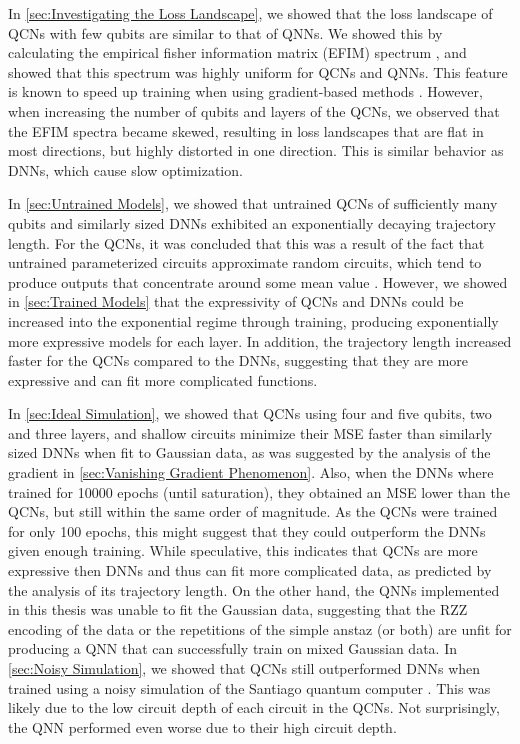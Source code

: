 In \cref{sec:Investigating the Loss Landscape}, we showed that the loss landscape of QCNs with few qubits are similar to that of QNNs. We showed this by calculating the empirical fisher information matrix (EFIM) spectrum \cite{karakida2019universal}, and showed that this spectrum was highly uniform for QCNs and QNNs. This feature is known to speed up training when using gradient-based methods \cite{karakida2019universal}. However, when increasing the number of qubits and layers of the QCNs, we observed that the EFIM spectra became skewed, resulting in loss landscapes that are flat in most directions, but highly distorted in one direction. This is similar behavior as DNNs, which cause slow optimization.

In \cref{sec:Untrained Models}, we showed that untrained QCNs of sufficiently many qubits and similarly sized DNNs exhibited an exponentially decaying trajectory length. For the QCNs, it was concluded that this was a result of the fact that untrained parameterized circuits approximate random circuits, which tend to produce outputs that concentrate around some mean value \cite{McClean_2018}. However, we showed in \cref{sec:Trained Models} that the expressivity of QCNs and DNNs could be increased into the exponential regime through training, producing exponentially more expressive models for each layer. In addition, the trajectory length increased faster for the QCNs compared to the DNNs, suggesting that they are more expressive and can fit more complicated functions.

In \cref{sec:Ideal Simulation}, we showed that QCNs using four and five qubits, two and three layers, and shallow circuits minimize their MSE faster than similarly sized DNNs when fit to Gaussian data, as was suggested by the analysis of the gradient in \cref{sec:Vanishing Gradient Phenomenon}. Also, when the DNNs where trained for 10000 epochs (until saturation), they obtained an MSE lower than the QCNs, but still within the same order of magnitude. As the QCNs were trained for only 100 epochs, this might suggest that they could outperform the DNNs given enough training. While speculative, this indicates that QCNs are more expressive then DNNs and thus can fit more complicated data, as predicted by the analysis of its trajectory length. On the other hand, the QNNs implemented in this thesis was unable to fit the Gaussian data, suggesting that the RZZ encoding of the data or the repetitions of the simple anstaz (or both) are unfit for producing a QNN that can successfully train on mixed Gaussian data. In \cref{sec:Noisy Simulation}, we showed that QCNs still outperformed DNNs when trained using a noisy simulation of the Santiago quantum computer \cite{santiago}. This was likely due to the low circuit depth of each circuit in the QCNs. Not surprisingly, the QNN performed even worse due to their high circuit depth.   

